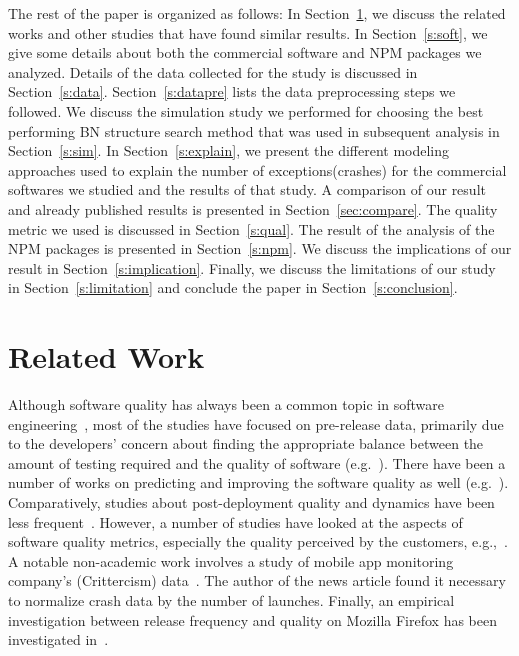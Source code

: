 \documentclass[smallextended]{svjour3}       %
\begin{document}
The rest of the paper is organized as follows: In Section~\ref{s:relwork}, we discuss the related works and other studies that have found similar results. In Section~\ref{s:soft}, we give some details about both the commercial software and NPM packages we analyzed. Details of the data collected for the study is discussed in Section~\ref{s:data}. Section~\ref{s:datapre} lists the data preprocessing steps we followed. We discuss the simulation study we performed for choosing the best performing BN structure search method that was used in subsequent analysis in Section~\ref{s:sim}. In Section~\ref{s:explain}, we present the different modeling approaches used to explain the number of exceptions(crashes) for the commercial softwares we studied and the results of that study. A comparison of our result and already published results is presented in Section~\ref{sec:compare}. 
The quality metric we used is discussed in Section~\ref{s:qual}. The result of the analysis of the NPM packages is presented in Section~\ref{s:npm}. We discuss the implications of our result in Section~\ref{s:implication}. Finally, we discuss the limitations of our study in Section~\ref{s:limitation} and conclude the paper in Section~\ref{s:conclusion}.  

\section{Related Work}\label{s:relwork}

Although software quality has always been a common
topic in software engineering~\cite{boehm1976quantitative,kitchenham1996software}, most of
the studies have focused on pre-release data, primarily due to the
developers' concern about finding the appropriate balance between
the amount of testing required and the quality of software
(e.g.~\cite{rubin2016challenges,dalal1988should}). There have been a
number of works on predicting and improving the software quality as
well (e.g.~\cite{MHP13,zhang2015towards,KSAHMSU13,MW00}). Comparatively,
studies about post-deployment quality and dynamics have been less
frequent~\cite{li2011characterizing,kenny1993estimating}. However, a
number of studies have looked at the aspects of software quality
metrics, especially the quality perceived by the customers,
e.g.,~\cite{mockus2005predictors,IQ08,hmps15,rotella2011implementing,M14}. A notable
non-academic work involves a study of mobile app monitoring
company's (Crittercism) data~\cite{crittercism12}. The author of the
news article found it necessary to normalize crash data by the
number of launches. Finally, an empirical investigation between
release frequency and quality on Mozilla Firefox has been
investigated in~\cite{khomh2012faster}. 
\end{document}

